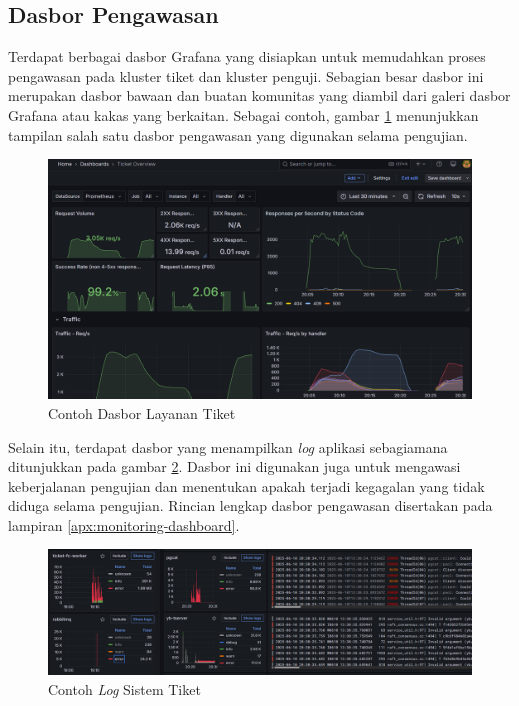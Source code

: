 \subsection{Dasbor Pengawasan}

Terdapat berbagai dasbor Grafana yang disiapkan untuk memudahkan proses pengawasan pada kluster tiket dan kluster penguji. Sebagian besar dasbor ini merupakan dasbor bawaan dan buatan komunitas yang diambil dari galeri dasbor Grafana atau kakas yang berkaitan. Sebagai contoh, gambar \ref{fig:ticket-dashboard-example} menunjukkan tampilan salah satu dasbor pengawasan yang digunakan selama pengujian.

\begin{figure}[htbp]
    \centering
    \includegraphics[width=1\textwidth]{resources/chapter-4/ticket-dashboard.png}
    \caption{Contoh Dasbor Layanan Tiket}
    \label{fig:ticket-dashboard-example}
\end{figure}

Selain itu, terdapat dasbor yang menampilkan \textit{log} aplikasi sebagiamana ditunjukkan pada gambar \ref{fig:log-example}. Dasbor ini digunakan juga untuk mengawasi keberjalanan pengujian dan menentukan apakah terjadi kegagalan yang tidak diduga selama pengujian. Rincian lengkap dasbor pengawasan disertakan pada lampiran \ref{apx:monitoring-dashboard}.

\begin{figure}[htbp]
    \centering
    \includegraphics[width=1\textwidth]{resources/chapter-4/log.png}
    \caption{Contoh \textit{Log} Sistem Tiket}
    \label{fig:log-example}
\end{figure}
